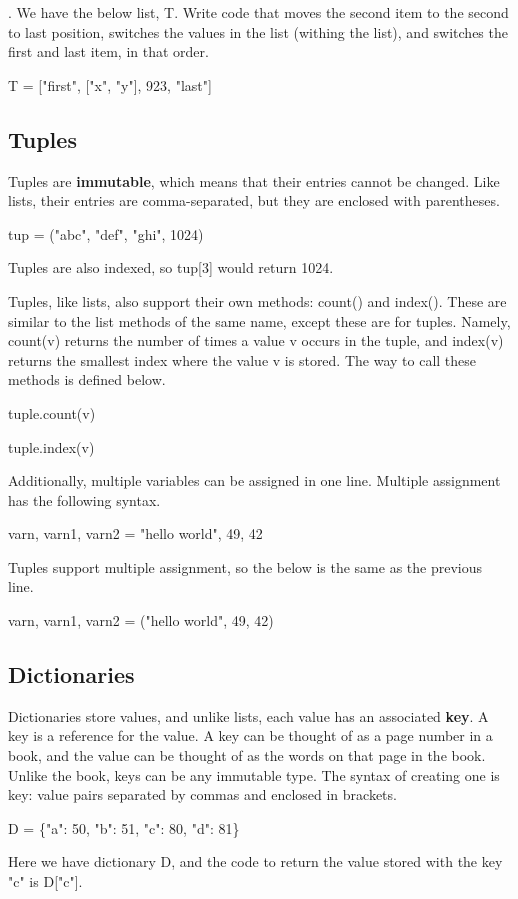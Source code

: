 \documentclass{article}
\newcommand{\define}[1]{\begin{center}\ttfamily #1\end{center}}
\newcommand{\icode}[1]{{\ttfamily #1}}
\newenvironment{code}{\begin{tcolorbox}\ttfamily}{\end{tcolorbox}}
\begin{document}
. We have the below list, \icode{T}. Write code that moves the second item to the second to last position, switches the values in the list (withing the list), and switches the first and last item, in that order.

\begin{code}
	T = ["first", ["x", "y"], 923, "last"]
\vspace{3 cm}
\end{code}

\subsection{Tuples}
Tuples are \textbf{immutable}, which means that their entries cannot be changed. Like lists, their entries are comma-separated, but they are enclosed with parentheses.
\define{tup = ("abc", "def", "ghi", 1024)}
Tuples are also indexed, so {\ttfamily tup[3]} would return 1024.

Tuples, like lists, also support their own methods: {\ttfamily count()} and {\ttfamily index()}. These are similar to the list methods of the same name, except these are for tuples. Namely, {\ttfamily count(v)} returns the number of times a value {\ttfamily v} occurs in the tuple, and {\ttfamily index(v)} returns the smallest index where the value {\ttfamily v} is stored. The way to call these methods is defined below.
\define{tuple.count(v)}
\define{tuple.index(v)}
Additionally, multiple variables can be assigned in one line. Multiple assignment has the following syntax.
\define{varn, varn1, varn2 = "hello world", 49, 42}
Tuples support multiple assignment, so the below is the same as the previous line.
\define{varn, varn1, varn2 = ("hello world", 49, 42)}
\subsection{Dictionaries}
Dictionaries store values, and unlike lists, each value has an associated \textbf{key}. A key is a reference for the value. A key can be thought of as a page number in a book, and the value can be thought of as the words on that page in the book. Unlike the book, keys can be any immutable type. The syntax of creating one is {\ttfamily key: value} pairs separated by commas and enclosed in brackets.
\define{D = \{"a": 50, "b": 51, "c": 80, "d": 81\}}
Here we have dictionary \icode{D}, and the code to return the value stored with the key \icode{"c"} is \icode{D["c"]}.
\end{document}
